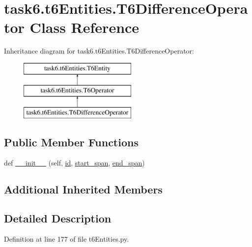 \hypertarget{classtask6_1_1t6Entities_1_1T6DifferenceOperator}{}\section{task6.\+t6\+Entities.\+T6\+Difference\+Operator Class Reference}
\label{classtask6_1_1t6Entities_1_1T6DifferenceOperator}
Inheritance diagram for task6.\+t6\+Entities.\+T6\+Difference\+Operator\+:\begin{figure}[H]
\begin{center}
\leavevmode
\includegraphics[height=3.000000cm]{classtask6_1_1t6Entities_1_1T6DifferenceOperator}
\end{center}
\end{figure}
\subsection*{Public Member Functions}
\begin{DoxyCompactItemize}
\item 
def \hyperlink{classtask6_1_1t6Entities_1_1T6DifferenceOperator_aabe355d243f7c3cac47bece7cb07f3af}{\+\_\+\+\_\+init\+\_\+\+\_\+} (self, \hyperlink{classtask6_1_1t6Entities_1_1T6Entity_afeeced8134bb3ebe0cfecc64d0ab46a4}{id}, \hyperlink{classtask6_1_1t6Entities_1_1T6Entity_a52779e9af8864dc98e8b02fc5b9b041a}{start\+\_\+span}, \hyperlink{classtask6_1_1t6Entities_1_1T6Entity_aeb402200b156cd9562c5111dfe777b98}{end\+\_\+span})
\end{DoxyCompactItemize}
\subsection*{Additional Inherited Members}


\subsection{Detailed Description}


Definition at line 177 of file t6\+Entities.\+py.




